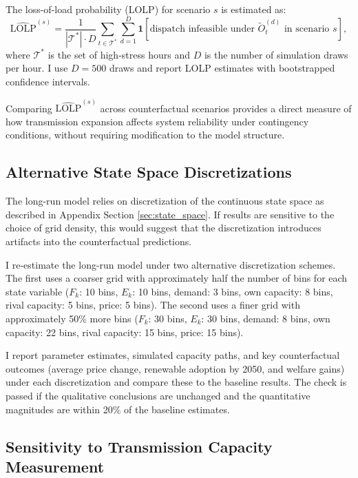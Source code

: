 \documentclass[12pt]{article}
\begin{document}
The loss-of-load probability (LOLP) for scenario $s$ is estimated as:
\begin{equation}
    \widehat{\text{LOLP}}^{(s)} = \frac{1}{|\mathcal{T}^*| \cdot D} \sum_{t \in \mathcal{T}^*} \sum_{d=1}^{D} \mathbf{1}\left[\text{dispatch infeasible under } \tilde{O}^{(d)}_t \text{ in scenario } s\right],
\end{equation}
where $\mathcal{T}^*$ is the set of high-stress hours and $D$ is the number of simulation draws per hour. I use $D = 500$ draws and report LOLP estimates with bootstrapped confidence intervals.

Comparing $\widehat{\text{LOLP}}^{(s)}$ across counterfactual scenarios provides a direct measure of how transmission expansion affects system reliability under contingency conditions, without requiring modification to the model structure.


\subsection{Alternative State Space Discretizations}\label{app:robustness:discretization}

The long-run model relies on discretization of the continuous state space as described in Appendix Section \ref{sec:state_space}. If results are sensitive to the choice of grid density, this would suggest that the discretization introduces artifacts into the counterfactual predictions.

I re-estimate the long-run model under two alternative discretization schemes. The first uses a coarser grid with approximately half the number of bins for each state variable ($F_k$: 10 bins, $E_k$: 10 bins, demand: 3 bins, own capacity: 8 bins, rival capacity: 5 bins, price: 5 bins). The second uses a finer grid with approximately 50\% more bins ($F_k$: 30 bins, $E_k$: 30 bins, demand: 8 bins, own capacity: 22 bins, rival capacity: 15 bins, price: 15 bins).

I report parameter estimates, simulated capacity paths, and key counterfactual outcomes (average price change, renewable adoption by 2050, and welfare gains) under each discretization and compare these to the baseline results. The check is passed if the qualitative conclusions are unchanged and the quantitative magnitudes are within 20\% of the baseline estimates.


\subsection{Sensitivity to Transmission Capacity Measurement}\label{app:robustness:transmission}
\end{document}
